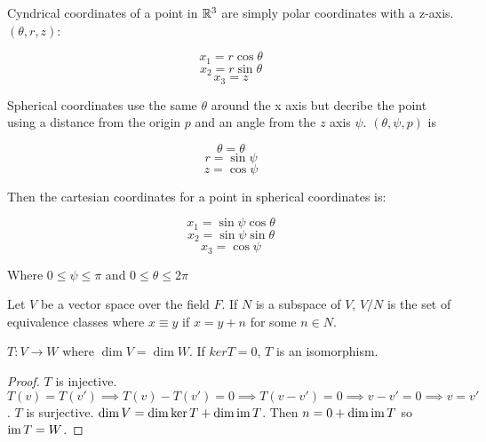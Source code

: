 \documentclass[10pt]{article}
\begin{document}
\begin{note}

	Cyndrical coordinates of a point in $\mathbb{R}^3$ are simply polar coordinates with
	a z-axis. $(\theta, r, z)$:

	\[ x_1 = r \cos \theta \]
	\[ x_2 = r \sin \theta \]
	\[ x_3 = z \]

	Spherical coordinates use the same $\theta$ around the x axis but decribe the
	point using a distance from the origin $p$ and an angle from the $z$ axis
	$\psi$. $(\theta, \psi, p)$ is 

	\[\theta = \theta \]
	\[r = \sin \psi \]
	\[z = \cos \psi \]

	Then the cartesian coordinates for a point in spherical coordinates is:

	\[x_1 = \sin \psi \cos \theta \]
	\[x_2 = \sin \psi \sin \theta \]
	\[x_3 = \cos \psi \]

	Where $0 \leq \psi \leq \pi$ and $0 \leq \theta \leq 2\pi$

\end{note}

\begin{note}
	Let $V$ be a vector space over the field $F$. If $N$ is a subspace of $V$, $V
	/ N$ is the set of equivalence classes where $x \equiv y$ if $x = y + n$ for
	some $n \in N$.
\end{note}

\begin{note}
	\begin{theorem}
	$T: V \to W$ where $\dim V = \dim W$. If $ker T = 0$, $T$ is an isomorphism. 
	\end{theorem}
		\begin{proof}
	$T$ is injective. $T(v) = T(v') \implies T(v) - T(v') = 0 \implies T(v - v') = 0 \implies v - v' = 0 \implies v = v'$.
	$T$ is surjective. $\dim V =  \dim \ker T + \dim \operatorname{im} T$. Then $n = 0 + \dim \operatorname{im} T$ so $\operatorname{im} T = W$.
		\end{proof}
\end{note}
	
\end{document}
